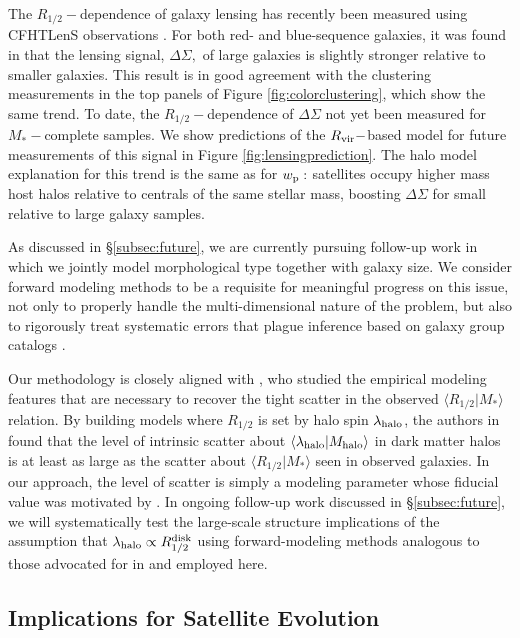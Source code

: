 \documentclass[usenatbib,usegraphicx,letterpaper]{mn2e}
\newcommand{\rhalf}{R_{1/2}}
\newcommand{\mstar}{M_{\ast}}
\newcommand{\mhalo}{M_{\rm halo}}
\newcommand{\rvir}{R_{\rm vir}}
\newcommand{\wproj}{w_{\rm p}}
\newcommand{\mean}[2]{\langle{#1}\vert{#2}\rangle}
\begin{document}
The $\rhalf-$dependence of galaxy lensing has recently been measured using CFHTLenS observations \citep{heymans_etal12,erben_etal13}. For both red- and blue-sequence galaxies, it was found in \citet{charlton_etal17} that the lensing signal, $\Delta\Sigma,$ of large galaxies is slightly stronger relative to smaller galaxies. This result is in good agreement with the clustering measurements in the top panels of Figure \ref{fig:colorclustering}, which show the same trend. To date, the $\rhalf-$dependence of $\Delta\Sigma$ not yet been measured for $\mstar-$complete samples. We show  predictions of the $\rvir-$based model for future measurements of this signal in Figure \ref{fig:lensingprediction}. The halo model explanation for this trend is the same as for $\wproj:$ satellites occupy higher mass host halos relative to centrals of the same stellar mass, boosting $\Delta\Sigma$ for small relative to large galaxy samples. 

As discussed in \S\ref{subsec:future}, we are currently pursuing follow-up work in which we jointly model morphological type together with galaxy size. We consider forward modeling methods to be a requisite for meaningful progress on this issue, not only to properly handle the multi-dimensional nature of the problem, but also to rigorously treat systematic errors that plague inference based on galaxy group catalogs \citep[see][for a thorough discussion]{campbell_etal15}.

Our methodology is closely aligned with \citet{somerville_etal17}, who studied the empirical modeling features that are necessary to recover the tight scatter in the observed $\mean{\rhalf}{\mstar}$ relation. By building models where $\rhalf$ is set by halo spin $\lambda_{\rm halo}$, the authors in \citet{somerville_etal17} found that the level of intrinsic scatter about $\langle\lambda_{\rm halo}\vert\mhalo\rangle$ in dark matter halos is at least as large as the scatter about $\langle\rhalf\vert\mstar\rangle$ seen in observed galaxies. In our approach, the level of scatter is simply a modeling parameter whose fiducial value was motivated by \citet{somerville_etal17}. In ongoing follow-up work discussed in \S\ref{subsec:future}, we will systematically test the large-scale structure implications of the assumption that $\lambda_{\rm halo}\propto\rhalf^{\rm disk}$ using forward-modeling methods analogous to those advocated for in \citet{somerville_etal17} and employed here. 

\subsection{Implications for Satellite Evolution}
\label{subsec:satellite_discussion}
\end{document}
